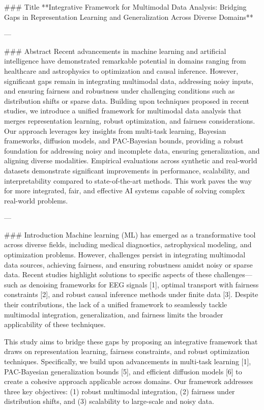 ### Title  
**Integrative Framework for Multimodal Data Analysis: Bridging Gaps in Representation Learning and Generalization Across Diverse Domains**

---

### Abstract  
Recent advancements in machine learning and artificial intelligence have demonstrated remarkable potential in domains ranging from healthcare and astrophysics to optimization and causal inference. However, significant gaps remain in integrating multimodal data, addressing noisy inputs, and ensuring fairness and robustness under challenging conditions such as distribution shifts or sparse data. Building upon techniques proposed in recent studies, we introduce a unified framework for multimodal data analysis that merges representation learning, robust optimization, and fairness considerations. Our approach leverages key insights from multi-task learning, Bayesian frameworks, diffusion models, and PAC-Bayesian bounds, providing a robust foundation for addressing noisy and incomplete data, ensuring generalization, and aligning diverse modalities. Empirical evaluations across synthetic and real-world datasets demonstrate significant improvements in performance, scalability, and interpretability compared to state-of-the-art methods. This work paves the way for more integrated, fair, and effective AI systems capable of solving complex real-world problems.

---

### Introduction  
Machine learning (ML) has emerged as a transformative tool across diverse fields, including medical diagnostics, astrophysical modeling, and optimization problems. However, challenges persist in integrating multimodal data sources, achieving fairness, and ensuring robustness amidst noisy or sparse data. Recent studies highlight solutions to specific aspects of these challenges—such as denoising frameworks for EEG signals [1], optimal transport with fairness constraints [2], and robust causal inference methods under finite data [3]. Despite their contributions, the lack of a unified framework to seamlessly tackle multimodal integration, generalization, and fairness limits the broader applicability of these techniques.  

This study aims to bridge these gaps by proposing an integrative framework that draws on representation learning, fairness constraints, and robust optimization techniques. Specifically, we build upon advancements in multi-task learning [1], PAC-Bayesian generalization bounds [5], and efficient diffusion models [6] to create a cohesive approach applicable across domains. Our framework addresses three key objectives: (1) robust multimodal integration, (2) fairness under distribution shifts, and (3) scalability to large-scale and noisy data.  

